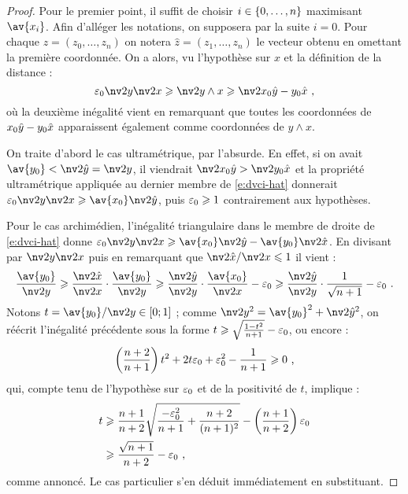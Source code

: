\begin{proof}
  Pour le premier point, il suffit de choisir \( i \in \lbrace 0, \dots, n \rbrace \)
  maximisant \( \av{x_i} \). Afin d'alléger les notations, on supposera par
  la suite \( i = 0 \). Pour chaque \( z = (z_0, \dots, z_n) \) on notera \(
    \hat{z} = (z_1, \dots, z_n) \) le vecteur obtenu en omettant la première
  coordonnée. On a alors, vu l'hypothèse sur \( x \) et la définition de la
  distance :
  \begin{equation} \label{e:dvci-hat}
    \eps_0 \nv2 y \nv2 x
    \ge
    \nv2{y \wedge x}
    \ge
    \nv2{x_0 \hatys - y_0 \hatxs}
    \pmm,
  \end{equation}
  où la deuxième inégalité vient en remarquant que toutes les coordonnées de
  \( x_0 \smash{\hat y} - y_0 \smash{\hat x} \) apparaissent également comme coordonnées de \(
    y \wedge x \).

  On traite d'abord le cas ultramétrique, par l'absurde. En effet, si on avait
  \( \av{y_0} < \nv2{\hatys} = \nv2{y} \), il viendrait \( \nv2{x_0 \hatys} >
    \nv2{y_0 \hatxs} \) et la propriété ultramétrique appliquée au dernier
  membre de \eqref{e:dvci-hat} donnerait \( \eps_0 \nv2{y}\nv2{x}  \ge
    \av{x_0}\nv2{\hatys} \), puis \( \varepsilon_0 \geqslant 1 \) contrairement aux
  hypothèses.

  Pour le cas archimédien, l'inégalité triangulaire dans le membre de droite
  de \eqref{e:dvci-hat} donne
  \( \eps_0 \nv2{y}\nv2{x}  \ge \av{x_0}\nv2{\hatys} - \av{y_0}\nv2{\hatxs}
  \).  En divisant par \( \nv2{y}\nv2{x} \) puis en remarquant que \(
    \nv2{\hatxs}/\nv2{x} \le 1 \) il vient :
  \begin{align}
    \frac{\av{y_0}}{\nv2{y}}
    \ge
    \frac{\nv2{\hatxs}}{\nv2{x}}
    \cdot \frac{\av{y_0}}{\nv2{y}}
    \ge
    \frac{\nv2{\hatys}}{\nv2{y}}
    \cdot \frac{\av{x_0}}{\nv2{x}}
    - \eps_0
    \ge
    \frac{\nv2{\hatys}}{\nv2{y}}
    \cdot
    \frac{1}{\sqrt{n+1}}
    - \eps_0
    \pmm.
  \end{align}
  Notons \( t = \av{y_0}/\nv2{y} \in [0; 1] \) ; comme \( \nv2{y}^2 =
    \av{y_0}^2 + \nv2{\hatys}^2 \), on réécrit l'inégalité précédente sous
  la forme \( t \geqslant \sqrt{\frac{1-t^2}{n+1}}-\varepsilon_0 \), ou encore :
  \begin{equation}
    \left( \frac{n+2}{n+1} \right) t^2
    + 2t\varepsilon_0
    + \varepsilon_0^2
    - \frac{1}{n+1}
    \geqslant
    0
    \text{ ,}
  \end{equation}
  qui, compte tenu de l'hypothèse sur \( \varepsilon_0 \) et de la positivité de \( t
  \), implique :
  \begin{align*}
    t
    & \geqslant
    \frac{n+1}{n+2}
    \sqrt{ \frac{-\varepsilon_0^2}{n+1}+\frac{n+2}{(n+1)^2} }
    - \left( \frac{n+1}{n+2} \right) \varepsilon_0
    \\ & \geqslant
    \frac{\sqrt{n+1}}{n+2} - \varepsilon_0
    \text{ ,}
  \end{align*}
  comme annoncé. Le cas particulier s'en déduit immédiatement en substituant.
\end{proof}

